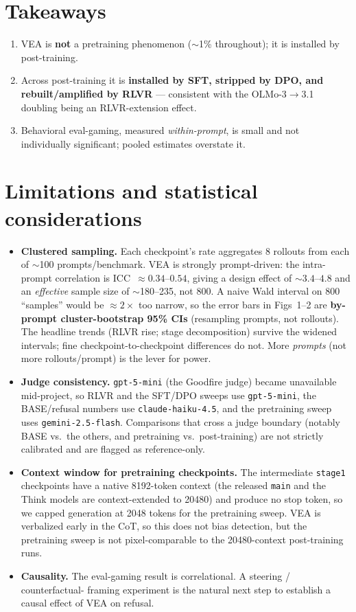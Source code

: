 \documentclass[11pt]{article}
\begin{document}
\section{Takeaways}
\begin{enumerate}\itemsep2pt
\item VEA is \textbf{not} a pretraining phenomenon ($\sim$1\% throughout); it is installed by
post-training.
\item Across post-training it is \textbf{installed by SFT, stripped by DPO, and
rebuilt/amplified by RLVR} --- consistent with the OLMo-3$\to$3.1 doubling being an
RLVR-extension effect.
\item Behavioral eval-gaming, measured \emph{within-prompt}, is small and not individually
significant; pooled estimates overstate it.
\end{enumerate}

\section{Limitations and statistical considerations}\label{sec:limits}
\begin{itemize}\itemsep2pt
\item \textbf{Clustered sampling.} Each checkpoint's rate aggregates $8$ rollouts from each of
$\sim$100 prompts/benchmark. VEA is strongly prompt-driven: the intra-prompt correlation is
ICC~$\approx0.34$--$0.54$, giving a design effect of $\sim$$3.4$--$4.8$ and an
\emph{effective} sample size of $\sim$180--235, not 800. A naive Wald interval on 800
``samples'' would be $\approx2\times$ too narrow, so the error bars in Figs~1--2 are
\textbf{by-prompt cluster-bootstrap 95\% CIs} (resampling prompts, not rollouts). The headline
trends (RLVR rise; stage decomposition) survive the widened intervals; fine
checkpoint-to-checkpoint differences do not. More \emph{prompts} (not more rollouts/prompt)
is the lever for power.
\item \textbf{Judge consistency.} \texttt{gpt-5-mini} (the Goodfire judge) became unavailable
mid-project, so RLVR and the SFT/DPO sweeps use \texttt{gpt-5-mini}, the BASE/refusal numbers
use \texttt{claude-haiku-4.5}, and the pretraining sweep uses \texttt{gemini-2.5-flash}.
Comparisons that cross a judge boundary (notably BASE vs.\ the others, and pretraining vs.\
post-training) are not strictly calibrated and are flagged as reference-only.
\item \textbf{Context window for pretraining checkpoints.} The intermediate \texttt{stage1}
checkpoints have a native 8192-token context (the released \texttt{main} and the Think models
are context-extended to 20480) and produce no stop token, so we capped generation at 2048
tokens for the pretraining sweep. VEA is verbalized early in the CoT, so this does not bias
detection, but the pretraining sweep is not pixel-comparable to the 20480-context
post-training runs.
\item \textbf{Causality.} The eval-gaming result is correlational. A steering / counterfactual-
framing experiment is the natural next step to establish a causal effect of VEA on refusal.
\end{itemize}
\end{document}
